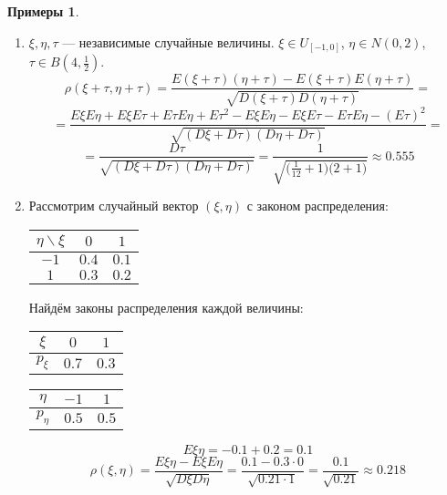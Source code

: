 \documentclass[11pt,openany,a4paper]{scrartcl}
\theoremstyle{plain}
\theoremstyle{definition}
\newtheorem{examples}[theorem]{Примеры}
\begin{document}
\begin{examples}
\mbox{}
    \begin{enumerate}
        \item $\xi, \eta, \tau$ — независимые случайные величины.
        $\xi \in U_{[-1, 0]}$,
        $\eta \in N(0, 2)$, $\tau \in B(4, \frac{1}{2})$.
        $$
        \rho(\xi + \tau, \eta + \tau) =
        \frac{E(\xi + \tau)(\eta + \tau) -
        E(\xi + \tau)E(\eta + \tau)}{\sqrt{D(\xi + \tau)D(\eta + \tau)}} =
        $$
        $$
        = \frac{E\xi E\eta + E\xi E\tau + E\tau E\eta + E\tau^2 - E\xi E\eta -
        E\xi E\tau - E\tau E\eta - (E\tau)^2}{\sqrt{(D\xi + D\tau)(D\eta + 
        D\tau)}} =
        $$
        $$
        = \frac{D\tau}{\sqrt{(D\xi + D\tau)(D\eta + D\tau)}} =
        \frac{1}{\sqrt{\big(\frac{1}{12} + 1\big)\big(2 + 1\big)}}
        \approx 0.555
        $$
        \item Рассмотрим случайный вектор $(\xi, \eta)$ с законом распределения:
        \begin{center}
            \begin{tabular}{| c | c | c |}
                \hline
                $\eta\backslash\xi$ & $0$ & $1$ \\ \hline
                $-1$ & $0.4$ & $0.1$ \\ \hline
                $1$ & $0.3$ & $0.2$ \\ \hline
            \end{tabular}
        \end{center}
        Найдём законы распределения каждой величины:
        \begin{center}
            \begin{tabular}{| c | c | c |}
                \hline
                $\xi$ & $0$ & $1$ \\ \hline
                $p_\xi$ & $0.7$ & $0.3$ \\ \hline
            \end{tabular}
            \begin{tabular}{| c | c | c |}
                \hline
                $\eta$ & $-1$ & $1$ \\ \hline
                $p_\eta$ & $0.5$ & $0.5$ \\ \hline
            \end{tabular}
        \end{center}
        
        $$
        E\xi\eta = -0.1 + 0.2 = 0.1
        $$
        $$
        \rho(\xi, \eta) = \frac{E\xi\eta - E\xi E\eta}{\sqrt{D\xi D\eta}} =
        \frac{0.1 - 0.3 \cdot 0}{\sqrt{0.21 \cdot 1}} = \frac{0.1}{\sqrt{0.21}}
        \approx 0.218
        $$
    \end{enumerate}
\end{examples}
\end{document}
